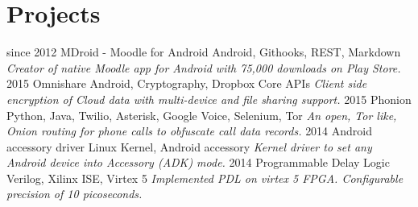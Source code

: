 \documentclass[]{friggeri-cv}
\begin{document}
\section{Projects}
\begin{entrylist}
  \entry
    {since 2012}
    {MDroid - Moodle for Android}
    {Android, Githooks, REST, Markdown}
    {\emph{Creator of native Moodle app for Android with 75,000 downloads on Play Store.}}
  \entry
    {2015}
    {Omnishare}
    {Android, Cryptography, Dropbox Core APIs}
    {\emph{Client side encryption of Cloud data with multi-device and file sharing support.}}
  \entry
    {2015}
    {Phonion}
    {Python, Java, Twilio, Asterisk, Google Voice, Selenium, Tor}
    {\emph{An open, Tor like, Onion routing for phone calls to obfuscate call data records.}}
  \entry
    {2014}
    {Android accessory driver}
    {Linux Kernel, Android accessory}
    {\emph{Kernel driver to set any Android device into Accessory (ADK) mode.}}
  \entry
    {2014}
    {Programmable Delay Logic}
    {Verilog, Xilinx ISE, Virtex 5}
    {\emph{Implemented PDL on virtex 5 FPGA. Configurable precision of 10 picoseconds.}}
\end{entrylist}
\end{document}
